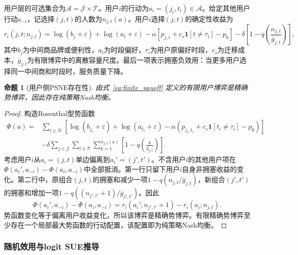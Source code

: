 \documentclass[UTF8,11pt]{ctexart}
\newtheorem{proposition}{命题}
\newcommand{\qos}{q}
\newcommand{\T}{\mathcal{T}}
\newcommand{\J}{\mathcal{J}}
\newcommand{\N}{\mathcal{N}}
\newcommand{\A}{\mathcal{A}}
\begin{document}
用户层的可选集合为$\A=\J\times\T$。用户$i$的行动为$a_i=(j_i,t_i)\in\A$。给定其他用户行动$a_{-i}$，记选择$(j,t)$的人数为$n_{j,t}(a)$。用户$i$选择$(j,t)$的确定性收益为
\begin{equation}
  r_i(j,t;n_{j,t}) =
  \log(b_j+\varepsilon)+\log(a_t+\varepsilon)
  -\alpha\left[p_{j,t}+c_s\mathbf{1}[t\ne \tau_i]-p_0\right]
  -\delta\left[1-\qos\!\left(\frac{n_{j,t}}{\bar g_{j,t}}\right)\right],
  \label{eq:finite_payoff}
\end{equation}
其中$b_j$为中间商品牌或便利性，$a_t$为时段偏好，$\tau_i$为用户原偏好时段，$c_s$为迁移成本，$\bar g_{j,t}$为有限博弈中的离散容量尺度。最后一项表示拥塞负效用：当更多用户选择同一中间商和时段时，服务质量下降。

\begin{proposition}[用户侧PSNE存在性]
\label{prop:psne}
由式~\eqref{eq:finite_payoff} 定义的有限用户博弈是精确势博弈，因此存在纯策略Nash均衡。
\end{proposition}

\begin{proof}
构造Rosenthal型势函数
\begin{align}
  \Phi(a)=
  &\sum_{i\in\N}
  \left[\log(b_{j_i}+\varepsilon)+\log(a_{t_i}+\varepsilon)
  -\alpha\left(p_{j_i,t_i}+c_s\mathbf{1}[t_i\ne \tau_i]-p_0\right)\right] \nonumber\\
  &-\delta\sum_{j\in\J}\sum_{t\in\T}
  \sum_{k=1}^{n_{j,t}(a)}
  \left[1-\qos\!\left(\frac{k}{\bar g_{j,t}}\right)\right].
  \label{eq:potential}
\end{align}
考虑用户$i$从$a_i=(j,t)$单边偏离到$a_i'=(j',t')$。不含用户$i$的其他用户项在$\Phi(a_i',a_{-i})-\Phi(a_i,a_{-i})$中全部抵消。第一行只留下用户$i$自身非拥塞收益的变化。第二行中，原组合$(j,t)$的拥塞和减少一项$1-\qos(n_{j,t}/\bar g_{j,t})$，新组合$(j',t')$的拥塞和增加一项$1-\qos((n_{j',t'}+1)/\bar g_{j',t'})$。因此
\[
\Phi(a_i',a_{-i})-\Phi(a_i,a_{-i})
=r_i(a_i';n_{j',t'}+1)-r_i(a_i;n_{j,t}).
\]
势函数变化等于偏离用户收益变化，所以该博弈是精确势博弈。有限精确势博弈至少存在一个局部最大势函数的行动配置，该配置即为纯策略Nash均衡\cite{rosenthal1973class,monderer1996potential}。
\end{proof}

\subsubsection{随机效用与logit SUE推导}
\end{document}
